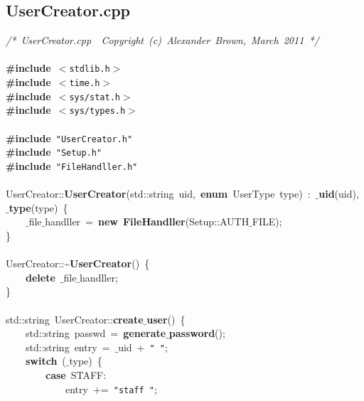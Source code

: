 \subsection{UserCreator.cpp}
\scriptsize
\sffamily
\noindent
\mbox{}\textit{/*\ UserCreator.cpp\ \ Copyright\ (c)\ Alexander\ Brown,\ March\ 2011\ */} \\
\mbox{} \\
\mbox{}\textbf{\#include}\ \texttt{$<$stdlib.h$>$} \\
\mbox{}\textbf{\#include}\ \texttt{$<$time.h$>$} \\
\mbox{}\textbf{\#include}\ \texttt{$<$sys/stat.h$>$} \\
\mbox{}\textbf{\#include}\ \texttt{$<$sys/types.h$>$} \\
\mbox{} \\
\mbox{}\textbf{\#include}\ \texttt{"{}UserCreator.h"{}} \\
\mbox{}\textbf{\#include}\ \texttt{"{}Setup.h"{}} \\
\mbox{}\textbf{\#include}\ \texttt{"{}FileHandller.h"{}} \\
\mbox{} \\
\mbox{}UserCreator::\textbf{UserCreator}(std::string\ uid,\ \textbf{enum}\ UserType\ type)\ :\ \textbf{$\_$uid}(uid),\ \textbf{$\_$type}(type)\ \{ \\
\mbox{}\ \ \ \ $\_$file$\_$handller\ =\ \textbf{new}\ \textbf{FileHandller}(Setup::AUTH$\_$FILE); \\
\mbox{}\} \\
\mbox{} \\
\mbox{}UserCreator::\textasciitilde{}\textbf{UserCreator}()\ \{ \\
\mbox{}\ \ \ \ \textbf{delete}\ $\_$file$\_$handller; \\
\mbox{}\} \\
\mbox{} \\
\mbox{}std::string\ UserCreator::\textbf{create$\_$user}()\ \{ \\
\mbox{}\ \ \ \ std::string\ passwd\ =\ \textbf{generate$\_$password}(); \\
\mbox{}\ \ \ \ std::string\ entry\ =\ $\_$uid\ +\ \texttt{"{}\ "{}}; \\
\mbox{}\ \ \ \ \textbf{switch}\ ($\_$type)\ \{ \\
\mbox{}\ \ \ \ \ \ \ \ \textbf{case}\ STAFF: \\
\mbox{}\ \ \ \ \ \ \ \ \ \ \ \ entry\ +=\ \texttt{"{}staff\ "{}}; \\
